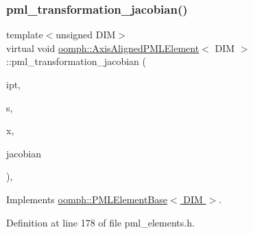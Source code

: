 \subsubsection{\texorpdfstring{pml\+\_\+transformation\+\_\+jacobian()}{pml\_transformation\_jacobian()}\hspace{0.1cm}{\footnotesize\ttfamily [2/4]}}
{\footnotesize\ttfamily template$<$unsigned D\+IM$>$ \\
virtual void \hyperlink{classoomph_1_1AxisAlignedPMLElement}{oomph\+::\+Axis\+Aligned\+P\+M\+L\+Element}$<$ D\+IM $>$\+::pml\+\_\+transformation\+\_\+jacobian (\begin{DoxyParamCaption}\item[{const unsigned \&}]{ipt,  }\item[{const \hyperlink{classoomph_1_1Vector}{Vector}$<$ double $>$ \&}]{s,  }\item[{const \hyperlink{classoomph_1_1Vector}{Vector}$<$ double $>$ \&}]{x,  }\item[{\hyperlink{classoomph_1_1DenseComplexMatrix}{Dense\+Complex\+Matrix} \&}]{jacobian }\end{DoxyParamCaption})\hspace{0.3cm}{\ttfamily [inline]}, {\ttfamily [virtual]}}



Implements \hyperlink{classoomph_1_1PMLElementBase_a770d8de20d8ae2d55f5f006052a39b3f}{oomph\+::\+P\+M\+L\+Element\+Base$<$ D\+I\+M $>$}.



Definition at line 178 of file pml\+\_\+elements.\+h.

\mbox{\label{classoomph_1_1AxisAlignedPMLElement_a6407fbc195aab8b5a3c3746df1f4aa63}} 
